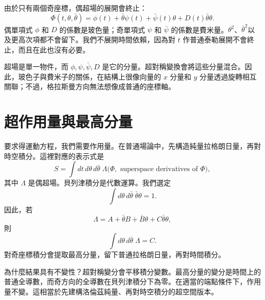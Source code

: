 由於只有兩個奇座標，偶超場的展開會終止：
\begin{equation}
\Phi(t,\theta,\bar\theta)
=\phi(t)+\bar\theta\psi(t)+\bar\psi(t)\theta
+D(t)\bar\theta\theta.
\label{eq:l7-superfield}
\end{equation}
偶單項式 \(\phi\) 和 \(D\) 的係數是玻色量；奇單項式 \(\psi\) 和 \(\bar\psi\) 的係數是費米量。\(\theta^2\)、\(\bar\theta^2\)以及更高次項都不會留下。我們不展開時間依賴，因為對 \(t\) 作普通泰勒展開不會終止，而且在此也沒有必要。

\begin{classroomqa}
\end{classroomqa}

超場是單一物件，而 \(\phi,\psi,\bar\psi,D\) 是它的分量。超對稱變換會將這些分量混合。因此，玻色子與費米子的關係，在結構上很像向量的 \(x\) 分量和 \(y\) 分量透過旋轉相互關聯；不過，格拉斯曼方向無法想像成普通的座標軸。

\section{超作用量與最高分量}

要求得運動方程，我們需要作用量。在普通場論中，先構造純量拉格朗日量，再對時空積分。這裡對應的表示式是
\begin{equation}
S=\int dt\,d\theta\,d\bar\theta\;\Lambda
\bigl(\Phi,\text{ superspace derivatives of }\Phi\bigr),
\label{eq:l7-superaction}
\end{equation}
其中 \(\Lambda\) 是偶超場。貝列津積分是代數運算。我們選定
\begin{equation}
\int d\theta\,d\bar\theta\;\bar\theta\theta=1.
\end{equation}
因此，若
\begin{equation}
\Lambda=A+\bar\theta B+\bar B\theta+C\bar\theta\theta,
\end{equation}
則
\begin{equation}
\int d\theta\,d\bar\theta\;\Lambda=C.
\label{eq:l7-top-component}
\end{equation}
對奇座標積分會提取最高分量，留下普通拉格朗日量，再對時間積分。

為什麼結果具有不變性？超對稱變分會平移積分變數。最高分量的變分是時間上的普通全導數，而奇方向的全導數在貝列津積分下為零。在適當的端點條件下，作用量不變。這相當於先建構洛倫茲純量、再對時空積分的超空間版本。

